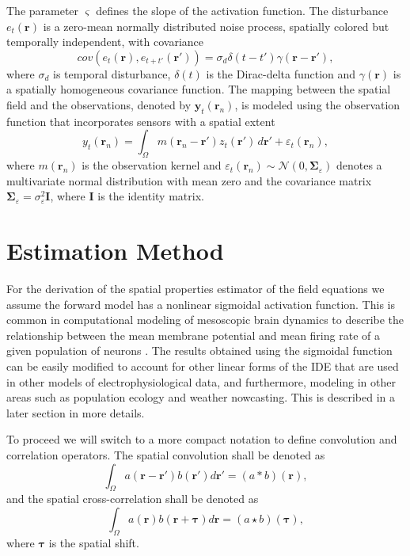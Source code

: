 \documentclass[10pt,twocolumn,twoside]{IEEEtran}
\begin{document}
The parameter $\varsigma$ defines the slope of the activation function.
The disturbance $e_{t}(\mathbf{r})$ is a zero-mean normally distributed noise process, spatially colored but temporally independent, with covariance \cite{Rasmussen2005}
\begin{equation}
cov\left(e_{t}\left(\mathbf{r}\right),e_{t+t'}\left(\mathbf{r'}\right)\right)=\sigma_d\delta(t-t')\gamma(\mathbf{r}-\mathbf{r'}),
\label{eq:FieldDisturbance}
\end{equation}
where $\sigma_d$ is temporal disturbance, $\delta(t)$ is the Dirac-delta function and $\gamma(\mathbf{r})$ is a spatially homogeneous covariance function.
The mapping between the spatial field and the observations, denoted by $\mathbf{y}_t(\mathbf{r}_n)$, is modeled using the observation function that incorporates sensors with a spatial extent
\begin{equation}\label{eq:ObservationEquation}
	y_t(\mathbf{r}_n) = \int_{\Omega} { m\left(\mathbf{r}_n-\mathbf{r}'\right) z_t\left(\mathbf{r}'\right) \, d\mathbf{r}'} + \varepsilon_t(\mathbf{r}_n), 
\end{equation}
where $m\left(\mathbf{r}_n\right)$ is the observation kernel and $\varepsilon_t(\mathbf{r}_n) \sim \mathcal{N}\left(0,\boldsymbol{\Sigma}_{\varepsilon}\right)$ denotes a multivariate normal distribution with mean zero and the covariance matrix $\boldsymbol{\Sigma}_{\varepsilon} = \sigma_{\varepsilon}^2\mathbf{I}$, where $\mathbf{I}$ is the identity matrix.


\section{Estimation Method}\label{sec:EstimationMethod}
For the derivation of the spatial properties estimator of the field equations we assume the forward model has a nonlinear sigmoidal activation function.
This is common in computational modeling of mesoscopic brain dynamics to describe the relationship between the mean membrane potential and mean firing rate of a given population of neurons \cite{Freeman1975}.
The results obtained using the sigmoidal function can be easily modified to account for other linear forms of the IDE that are used in other models of electrophysiological data, and furthermore, modeling in other areas such as population ecology and weather nowcasting.
This is described in a later section in more details.


To proceed we will switch to a more compact notation to define convolution and correlation operators.
The spatial convolution shall be denoted as
\begin{equation}
	\int_\Omega a(\mathbf{r}-\mathbf{r}')b(\mathbf{r}')d\mathbf{r}' = (a\ast b)(\mathbf{r}),
\end{equation}
and the spatial cross-correlation shall be denoted as 
\begin{equation}
	\int_\Omega a(\mathbf{r})b(\mathbf{r}+\boldsymbol{\tau})d\mathbf{r} = (a\star b)(\boldsymbol{\tau}),
\end{equation} 
where $\boldsymbol{\tau}$ is the spatial shift.
\end{document}
